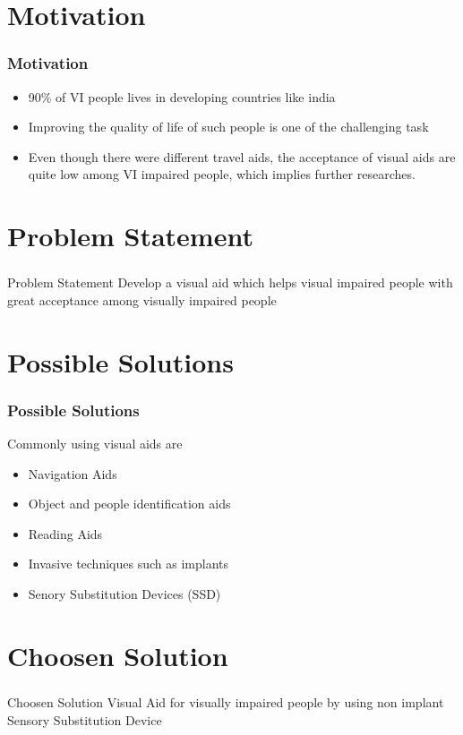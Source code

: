 \documentclass{beamer}
\begin{document}
\section{Motivation}
\begin{frame}
\frametitle{Motivation}
\begin{itemize}
\item
90\% of VI people lives in developing countries like india
\item
Improving the quality of life of such people is one of the challenging task
\item
Even though there were different travel aids, the acceptance of visual aids are quite low among VI impaired people, which implies further researches.
\end{itemize}
\end{frame}

\section{Problem Statement}
\begin{frame}
\frametitle{}
\begin{block}{Problem Statement}
Develop a visual aid which helps visual impaired people with great acceptance among visually impaired people
\end{block}
\end{frame}

\section{Possible Solutions}
\begin{frame}
\frametitle{Possible Solutions}
Commonly using visual aids are
\begin{itemize}
\item
Navigation Aids
\item
Object and people identification aids
\item
Reading Aids
\item
Invasive techniques such
as implants
\item
Senory Substitution Devices (SSD)

\end{itemize}
\end{frame}




\section{Choosen Solution}
\begin{frame}
\frametitle{}
\begin{block}{Choosen Solution}
Visual Aid for visually impaired people by using non implant Sensory Substitution Device
\end{block}
\end{frame}
\end{document}
